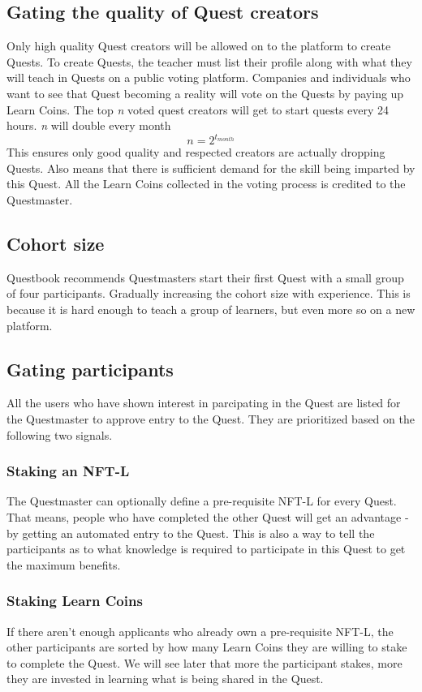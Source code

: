 \documentclass{article}
\begin{document}
    \subsection{Gating the quality of Quest creators}
      Only high quality Quest creators will be allowed on to the platform to create Quests. To create Quests, the teacher must list their profile along with what they will teach in Quests on a public voting platform.
      Companies and individuals who want to see that Quest becoming a reality will vote on the Quests by paying up Learn Coins. The top \textit{n} voted quest creators will get to start quests every 24 hours. \textit{n} will double every month
      \[
        n = 2^{t_{month}}
      \]
      This ensures only good quality and respected creators are actually dropping Quests. Also means that there is sufficient demand for the skill being imparted by this Quest.
      All the Learn Coins collected in the voting process is credited to the Questmaster.
    \subsection{Cohort size}
      Questbook recommends Questmasters start their first Quest with a small group of four participants. Gradually increasing the cohort size with experience. 
      This is because it is hard enough to teach a group of learners, but even more so on a new platform.
    \subsection{Gating participants}
      All the users who have shown interest in parcipating in the Quest are listed for the Questmaster to approve entry to the Quest. They are prioritized based on the following two signals.
      \subsubsection{Staking an NFT-L}
        The Questmaster can optionally define a pre-requisite NFT-L for every Quest. That means, people who have completed the other Quest will get an advantage - by getting an automated entry to the Quest.
        This is also a way to tell the participants as to what knowledge is required to participate in this Quest to get the maximum benefits. 
      \subsubsection{Staking Learn Coins}
        If there aren't enough applicants who already own a pre-requisite NFT-L, the other participants are sorted by how many Learn Coins they are willing to stake to complete the Quest.
        We will see later that more the participant stakes, more they are invested in learning what is being shared in the Quest.
\end{document}

